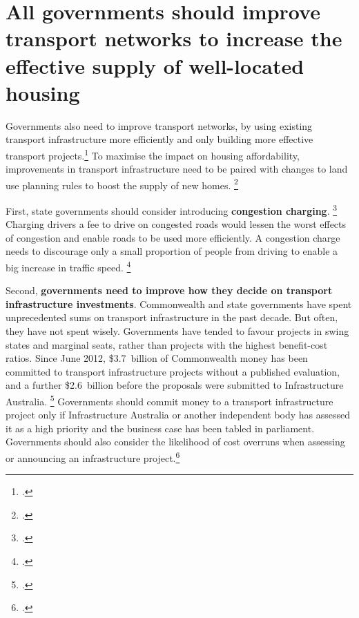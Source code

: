 \section{All governments should improve transport networks to increase the effective supply of well-located housing }\label{sec:all-governments-should-improve-transport-networks-to-increase-the-effective-supply-of-well-located-housing}

Governments also need to improve transport networks, by using existing transport infrastructure more efficiently and only building more effective transport projects.\footcite{IA_2018_Future_cities} To maximise the impact on housing affordability, improvements in transport infrastructure need to be paired with changes to land use planning rules to boost the supply of new homes.%
    \footcite{Schmahmann-2016-unlockingcitychapingpotential}

First, state governments should consider introducing \textbf{congestion charging}.%
	\footcites{OrangeBook-2016}{Fletcher-2016-Sydney-Institute-speech}{Terrill-2017-Road-congestion}
Charging drivers a fee to drive on congested roads would lessen the worst effects of congestion and enable roads to be used more efficiently.
A congestion charge needs to discourage only a small proportion of people from driving to enable a big increase in traffic speed.%
	\footcite[][172]{KellyDonegan2015-City-limits}

Second, \textbf{governments need to improve how they decide on transport infrastructure investments}.
Commonwealth and state governments have spent unprecedented sums on transport infrastructure in the past decade.
But often, they have not spent wisely.
Governments have tended to favour projects in swing states and marginal seats, rather than projects with the highest benefit-cost ratios.
Since June 2012, \$3.7~billion of Commonwealth money has been committed to transport infrastructure projects without a published evaluation, and a further \$2.6~billion before the proposals were submitted to Infrastructure Australia.%
	\footcite[][18]{Terrill-etal-2016-Cost-overruns-in-transport-infrastructure}
Governments should commit money to a transport infrastructure project only if Infrastructure Australia or another independent body has assessed it as a high priority and the business case has been tabled in parliament.
Governments should also consider the likelihood of cost overruns when assessing or announcing an infrastructure project.\footcite{Terrill-etal-2016-Cost-overruns-in-transport-infrastructure}

